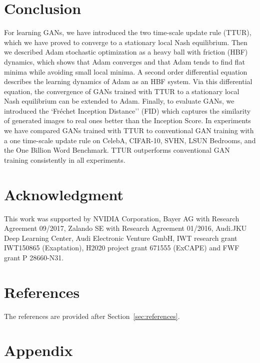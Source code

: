 \documentclass{article}
\begin{document}
\section*{Conclusion}
\label{sec:conclusion}
For learning GANs, we have introduced the two time-scale update rule (TTUR),
which we have proved to converge to a stationary local Nash equilibrium.
Then we described Adam stochastic optimization as a heavy ball with friction
(HBF) dynamics, which shows that Adam converges and that Adam tends to find flat
minima while avoiding small local minima.
A second order differential equation describes the learning dynamics of Adam as
an HBF system. Via this differential equation, the convergence of GANs trained
with TTUR to a stationary local Nash equilibrium can be extended to Adam.
Finally, to evaluate GANs, we introduced the `Fr\'{e}chet Inception Distance''
(FID) which captures the similarity of generated images to real ones better than
the Inception Score. In experiments we have compared GANs trained with TTUR to
conventional GAN training with a one time-scale update rule
on CelebA, CIFAR-10, SVHN, LSUN Bedrooms, and the One
Billion Word Benchmark. TTUR outperforms conventional GAN training consistently
in all experiments.

\section*{Acknowledgment}
This work was supported by NVIDIA Corporation, Bayer AG with Research Agreement
09/2017, Zalando SE with Research Agreement 01/2016, Audi.JKU Deep Learning
Center, Audi Electronic Venture GmbH, IWT research grant IWT150865 (Exaptation),
H2020 project grant 671555 (ExCAPE) and FWF grant P 28660-N31.

\section*{References}
The references are provided after Section~\ref{sec:references}.

\section*{Appendix}
\renewcommand{\thesection}{A\arabic{section}}
\renewcommand{\thefigure}{A\arabic{figure}}
\renewcommand{\thetable}{A\arabic{table}}

\sectionfont{\large}
\subsectionfont{\normalsize}
\subsubsectionfont{\normalsize}
\paragraphfont{\normalsize}
\end{document}
